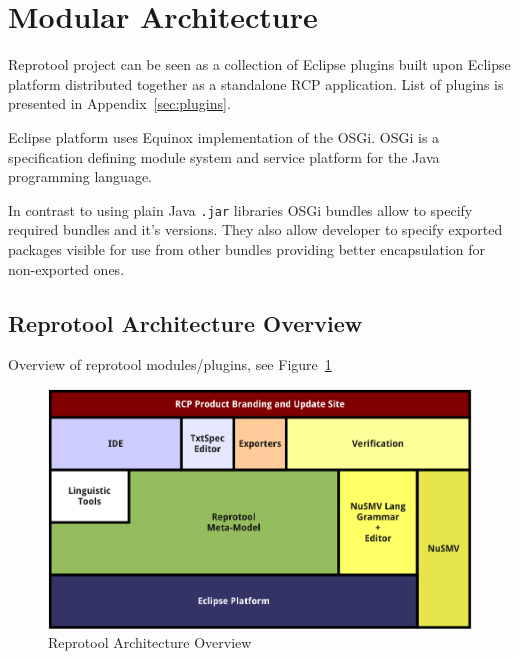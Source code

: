 \section{Modular Architecture}
Reprotool project can be seen as a collection of Eclipse plugins built upon Eclipse platform distributed together as a standalone \ac{RCP} application.
List of plugins is presented in Appendix~\ref{sec:plugins}.

Eclipse platform uses Equinox implementation of the OSGi. OSGi is a specification defining module system and service platform for the Java programming language.

In contrast to using plain Java \verb|.jar| libraries OSGi bundles allow to specify required bundles and it's versions. They also allow developer to specify exported packages visible for use from other bundles providing better encapsulation for non-exported ones.

	


\subsection{Reprotool Architecture Overview}
Overview of reprotool modules/plugins, see Figure~\ref{fig:ArchitectureOverview}
	
\begin{figure}[ht]
  \centering
  \includegraphics[width=\textwidth]{images/ArchitectureOverview}
  \caption{Reprotool Architecture Overview}
  \label{fig:ArchitectureOverview}
\end{figure}

